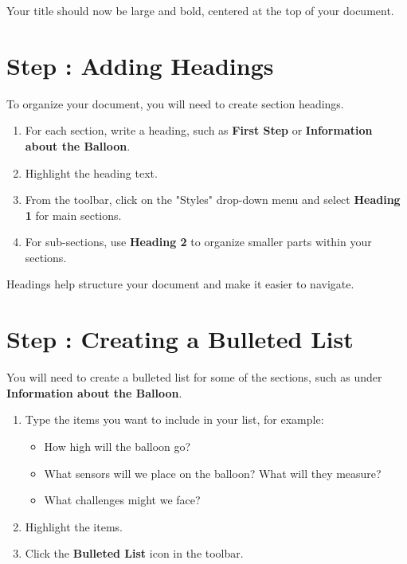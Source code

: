 \documentclass{article}
\begin{document}
Your title should now be large and bold, centered at the top of your document.

\section{Step : Adding Headings}

To organize your document, you will need to create section headings.

\begin{tcolorbox}[colback=green!10!white, colframe=green!75!black, title=Instructions]
  \begin{enumerate}
    \item For each section, write a heading, such as \textbf{First Step} or \textbf{Information about the Balloon}.  
    \item Highlight the heading text.  
    \item From the toolbar, click on the "Styles" drop-down menu and select \textbf{Heading 1} for main sections.  
    \item For sub-sections, use \textbf{Heading 2} to organize smaller parts within your sections.  
  \end{enumerate}

\end{tcolorbox}

Headings help structure your document and make it easier to navigate.

\section{Step : Creating a Bulleted List}

You will need to create a bulleted list for some of the sections, such as under \textbf{Information about the Balloon}.

\begin{tcolorbox}[colback=green!10!white, colframe=green!75!black, title=Instructions]
  \begin{enumerate}
    \item Type the items you want to include in your list, for example:  
      \begin{itemize}
        \item How high will the balloon go?  
        \item What sensors will we place on the balloon? What will they measure?  
        \item What challenges might we face?  
      \end{itemize}
  \item Highlight the items.  
  \item Click the \textbf{Bulleted List} icon in the toolbar. 
    \end{enumerate} 
\end{tcolorbox}
\end{document}

